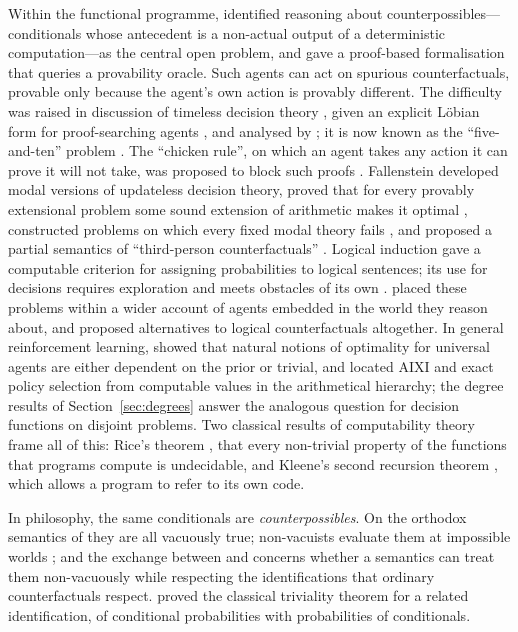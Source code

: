 Within the functional programme, \textcite{soaresfallenstein2015} identified reasoning about
counterpossibles---conditionals whose antecedent is a non-actual output of a deterministic
computation---as the central open problem, and gave a proof-based formalisation that queries a
provability oracle. Such agents can act on spurious counterfactuals, provable only because the agent's own action is
provably different. The difficulty was raised in discussion of timeless decision theory
\autocite{drescher2009}, given an explicit Löbian form for proof-searching agents
\autocite{slepnev2010,slepnev2012}, and analysed by \textcite{bensontilsen2014}; it is now known as the
\enquote{five-and-ten} problem \autocite{fallenstein2013fiveandten,demskigarrabrant2019}. The
\enquote{chicken rule}, on which an agent takes any action it can prove it will not take, was
proposed to block such proofs \autocite{slepnev2011}. Fallenstein developed
modal versions of updateless decision theory, proved that for every provably extensional problem
some sound extension of arithmetic makes it optimal \autocite{fallenstein2014optimality,
fallenstein2014improving}, constructed problems on which every fixed modal theory fails
\autocite{fallenstein2014evil}, and proposed a partial semantics of \enquote{third-person
counterfactuals} \autocite{fallenstein2015third,fallenstein2015chicken}. Logical induction
\autocite{garrabrant2016li} gave a computable criterion for assigning probabilities to logical
sentences; its use for decisions requires exploration and meets obstacles of its own
\autocite{garrabrant2017obstacles}. \textcite{demskigarrabrant2019} placed these problems within a
wider account of agents embedded in the world they reason about, and \textcite{taylor2020}
proposed alternatives to logical counterfactuals altogether. In general reinforcement learning,
\textcite{leikehutter2015} showed that natural notions of optimality for universal agents are either
dependent on the prior or trivial, and \textcite{leikehutter2015aixi} located AIXI and exact policy
selection from computable values in the arithmetical hierarchy; the degree results of
Section~\ref{sec:degrees} answer the analogous question for decision functions on disjoint problems.
Two classical results of computability theory frame all of this:
Rice's theorem \autocite{rice1953}, that every non-trivial property of the functions that programs
compute is undecidable, and Kleene's second recursion theorem \autocite{kleene1938,moschovakis2010}, which
allows a program to refer to its own code.

In philosophy, the same conditionals are \emph{counterpossibles}. On the orthodox semantics of
\textcite{lewis1973counterfactuals} they are all vacuously true; non-vacuists evaluate them at impossible
worlds \autocite{nolan1997,brogaardsalerno2013}; and the exchange between \textcite{williamson2015,williamson2018}
and \textcite{bertoetal2018} concerns whether a semantics can treat them non-vacuously while respecting
the identifications that ordinary counterfactuals respect. \textcite{lewis1976} proved the classical
triviality theorem for a related identification, of conditional probabilities with probabilities of
conditionals.


